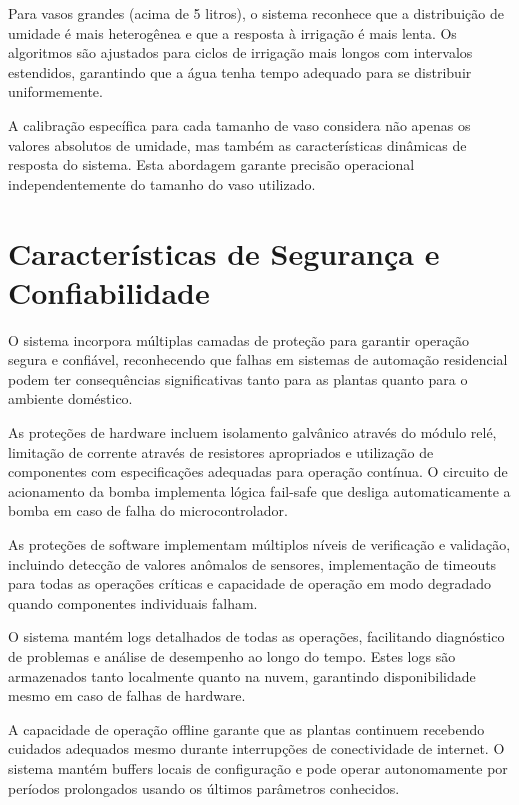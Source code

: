 Para vasos grandes (acima de 5 litros), o sistema reconhece que a distribuição de umidade é mais heterogênea e que a resposta à irrigação é mais lenta. Os algoritmos são ajustados para ciclos de irrigação mais longos com intervalos estendidos, garantindo que a água tenha tempo adequado para se distribuir uniformemente.

A calibração específica para cada tamanho de vaso considera não apenas os valores absolutos de umidade, mas também as características dinâmicas de resposta do sistema. Esta abordagem garante precisão operacional independentemente do tamanho do vaso utilizado.


\section{Características de Segurança e Confiabilidade}

O sistema incorpora múltiplas camadas de proteção para garantir operação segura e confiável, reconhecendo que falhas em sistemas de automação residencial podem ter consequências significativas tanto para as plantas quanto para o ambiente doméstico.

As proteções de hardware incluem isolamento galvânico através do módulo relé, limitação de corrente através de resistores apropriados e utilização de componentes com especificações adequadas para operação contínua. O circuito de acionamento da bomba implementa lógica fail-safe que desliga automaticamente a bomba em caso de falha do microcontrolador.

As proteções de software implementam múltiplos níveis de verificação e validação, incluindo detecção de valores anômalos de sensores, implementação de timeouts para todas as operações críticas e capacidade de operação em modo degradado quando componentes individuais falham.

O sistema mantém logs detalhados de todas as operações, facilitando diagnóstico de problemas e análise de desempenho ao longo do tempo. Estes logs são armazenados tanto localmente quanto na nuvem, garantindo disponibilidade mesmo em caso de falhas de hardware.

A capacidade de operação offline garante que as plantas continuem recebendo cuidados adequados mesmo durante interrupções de conectividade de internet. O sistema mantém buffers locais de configuração e pode operar autonomamente por períodos prolongados usando os últimos parâmetros conhecidos.

